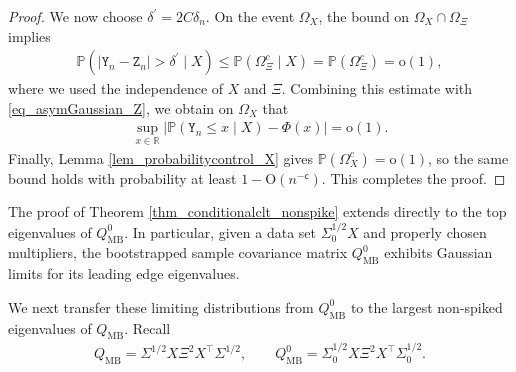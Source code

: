 \documentclass[12pt]{article}
\theoremstyle{plain}
\numberwithin{equation}{section}
\begin{document}
\begin{proof}
	We now choose $\delta^{\prime}=2C\delta_n$. On the event $\Omega_X$, the bound on $\Omega_X\cap\Omega_{\Xi}$ implies
	\begin{align*}
		\mathbb P(|\mathtt Y_n-\mathtt Z_n|>\delta^{\prime}\mid X)
		\le\mathbb P(\Omega_{\Xi}^c\mid X)=
		\mathbb P(\Omega_{\Xi}^c)=\mathrm{o}(1),
	\end{align*}
	where we used the independence of $X$ and $\Xi$. Combining this estimate with \eqref{eq_asymGaussian_Z}, we obtain on $\Omega_X$ that
	\begin{align*}
		\sup_{x\in\mathbb R}\left|\mathbb P(\mathtt Y_n\le x\mid X)-\Phi(x)\right|=\mathrm{o}(1).
	\end{align*}
	Finally, Lemma \ref{lem_probabilitycontrol_X} gives $\mathbb P(\Omega_X^c)=\mathrm{o}(1)$, so the same bound holds with probability at least $1-\mathrm{O}(n^{-\mathsf c})$. This completes the proof.
\end{proof}

The proof of Theorem \ref{thm_conditionalclt_nonspike} extends directly to the top eigenvalues of $Q_{\mathrm{MB}}^0$. In particular, given a data set $\Sigma_0^{1/2}X$ and properly chosen multipliers, the bootstrapped sample covariance matrix $Q_{\mathrm{MB}}^0$ exhibits Gaussian limits for its leading edge eigenvalues.


We next transfer these limiting distributions from $Q_{\mathrm{MB}}^0$ to the largest non-spiked eigenvalues of $Q_{\mathrm{MB}}$. Recall
\begin{align*}
	Q_{\mathrm{MB}}=\Sigma^{1/2}X\Xi^2X^\top \Sigma^{1/2},
	\qquad
	Q_{\mathrm{MB}}^0=\Sigma_0^{1/2}X\Xi^2X^\top \Sigma_0^{1/2}.
\end{align*}
\end{document}
